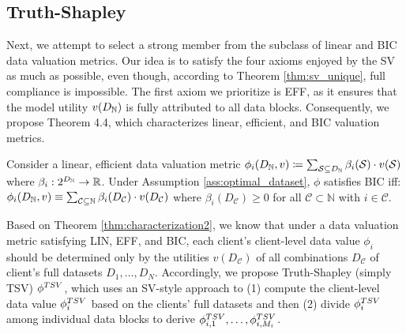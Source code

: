 \subsection{Truth-Shapley}
Next, we attempt to select a strong member from the subclass of linear and BIC data valuation metrics. 
Our idea is to satisfy the four axioms enjoyed by the SV as much as possible, even though, according to Theorem \ref{thm:sv_unique}, full compliance is impossible. 
The first axiom we prioritize is EFF, as it ensures that the model utility $v(D_{\mathbb{N}})$ is fully attributed to all data blocks.
Consequently, we propose Theorem 4.4, which characterizes linear, efficient, and BIC valuation metrics.


\begin{theorem}[Characterization 2]
\label{thm:characterization2}
    Consider a linear, efficient data valuation metric $\phi_i(D_{\mathbb{N}}, v) \coloneqq \sum_{\mathcal{S} \subseteq D_{\mathbb{N}}} \beta_i(\mathcal{S}) \cdot v(\mathcal{S})$ where $\beta_i: 2^{D_{\mathbb{N}}} \rightarrow \mathbb{R}$.
    Under Assumption \ref{ass:optimal_dataset}, $\phi$ satisfies BIC iff: $\phi_i(D_{\mathbb{N}}, v) \equiv \sum_{\mathcal{C} \subseteq \mathbb{N}} \beta_i(D_{\mathcal{C}}) \cdot v(D_{\mathcal{C}})$ where $\beta_i(D_{\mathcal{C}}) \geq 0$ for all $ \mathcal{C} \subset \mathbb{N}$ with $i\in \mathcal{C}$.
\end{theorem}

Based on Theorem \ref{thm:characterization2}, we know that under a data valuation metric satisfying LIN, EFF, and BIC, each client's client-level data value $\phi_i$ should be determined only by the utilities $v(D_\mathcal{C})$ of all combinations $D_\mathcal{C}$ of client's full datasets $D_1,\dots,D_N$. 
Accordingly, we propose Truth-Shapley (simply TSV) $\phi^{TSV}$, which uses an SV-style approach to (1) compute the client-level data value $\phi^{TSV}_i$ based on the clients' full datasets and then (2) divide $\phi^{TSV}_i$ among individual data blocks to derive $\phi^{TSV}_{i,1}, \dots, \phi^{TSV}_{i, M_i}$.

